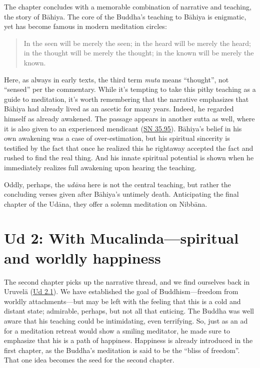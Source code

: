 \documentclass[12pt,openany]{book}%
\begin{document}
The chapter concludes with a memorable combination of narrative and teaching, the story of \textsanskrit{Bāhiya}. The core of the Buddha’s teaching to \textsanskrit{Bāhiya} is enigmatic, yet has become famous in modern meditation circles:

\begin{quotation}%
In the seen will be merely the seen; in the heard will be merely the heard; in the thought will be merely the thought; in the known will be merely the known.

%
\end{quotation}

Here, as always in early texts, the third term \textit{muta} means “thought”, not “sensed” per the commentary. While it’s tempting to take this pithy teaching as a guide to meditation, it’s worth remembering that the narrative emphasizes that \textsanskrit{Bāhiya} had already lived as an ascetic for many years. Indeed, he regarded himself as already awakened. The passage appears in another sutta as well, where it is also given to an experienced mendicant (\href{https://suttacentral.net/sn35.95/en/sujato}{SN 35.95}). \textsanskrit{Bāhiya}’s belief in his own awakening was a case of over-estimation, but his spiritual sincerity is testified by the fact that once he realized this he rightaway accepted the fact and rushed to find the real thing. And his innate spiritual potential is shown when he immediately realizes full awakening upon hearing the teaching.

Oddly, perhaps, the \textit{\textsanskrit{udāna}} here is not the central teaching, but rather the concluding verses given after \textsanskrit{Bāhiya}’s untimely death. Anticipating the final chapter of the \textsanskrit{Udāna}, they offer a solemn meditation on \textsanskrit{Nibbāna}.

\section*{Ud 2: With Mucalinda—spiritual and worldly happiness}

The second chapter picks up the narrative thread, and we find ourselves back in \textsanskrit{Uruvelā} (\href{https://suttacentral.net/ud2.1/en/sujato}{Ud 2.1}). We have established the goal of Buddhism—freedom from worldly attachments—but may be left with the feeling that this is a cold and distant state; admirable, perhaps, but not all that enticing. The Buddha was well aware that his teaching could be intimidating, even terrifying. So, just as an ad for a meditation retreat would show a smiling meditator, he made sure to emphasize that his is a path of happiness. Happiness is already introduced in the first chapter, as the Buddha’s meditation is said to be the “bliss of freedom”.  That one idea becomes the seed for the second chapter.
\end{document}
